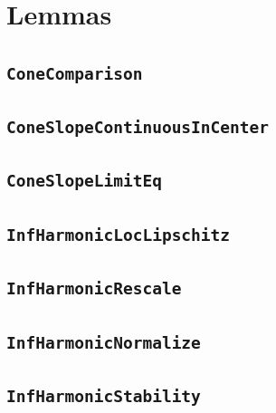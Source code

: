 \documentclass[11pt]{amsart}
\theoremstyle{definition}
\begin{document}
\section{Lemmas}
\subsection{\texorpdfstring{\texttt{ConeComparison}}{ConeComparison}}\label{node:ConeComparison}


\subsection{\texorpdfstring{\texttt{ConeSlopeContinuousInCenter}}{ConeSlopeContinuousInCenter}}\label{node:ConeSlopeContinuousInCenter}


\subsection{\texorpdfstring{\texttt{ConeSlopeLimitEq}}{ConeSlopeLimitEq}}\label{node:ConeSlopeLimitEq}


\subsection{\texorpdfstring{\texttt{InfHarmonicLocLipschitz}}{InfHarmonicLocLipschitz}}\label{node:InfHarmonicLocLipschitz}


\subsection{\texorpdfstring{\texttt{InfHarmonicRescale}}{InfHarmonicRescale}}\label{node:InfHarmonicRescale}


\subsection{\texorpdfstring{\texttt{InfHarmonicNormalize}}{InfHarmonicNormalize}}\label{node:InfHarmonicNormalize}


\subsection{\texorpdfstring{\texttt{InfHarmonicStability}}{InfHarmonicStability}}\label{node:InfHarmonicStability}

\end{document}
